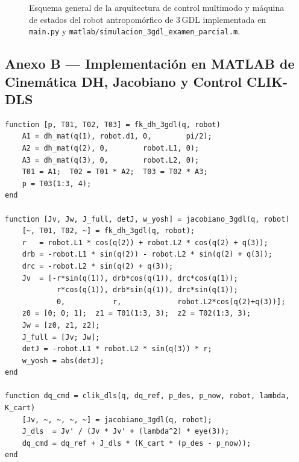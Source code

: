 \documentclass[11pt,a4paper]{article}
\newcommand{\qdot}{\dot{\bm{q}}}
\begin{document}
\begin{figure}[!htb]
{}%
\caption{Esquema general de la arquitectura de control multimodo y máquina de estados del robot antropomórfico de 3\,GDL implementada en \texttt{main.py} y \texttt{matlab/simulacion\_3gdl\_examen\_parcial.m}.}
\label{fig:arquitectura}
\end{figure}

\subsection{Anexo B --- Implementación en MATLAB de Cinemática DH, Jacobiano y Control CLIK-DLS}

\begin{lstlisting}[caption={Funciones principales de Denavit-Hartenberg, Jacobiano geométrico $6\times 3$ y ley de control cinemático CLIK-DLS en \texttt{matlab/simulacion\_3gdl\_examen\_parcial.m}.},label={lst:clik}]
function [p, T01, T02, T03] = fk_dh_3gdl(q, robot)
    A1 = dh_mat(q(1), robot.d1, 0,        pi/2);
    A2 = dh_mat(q(2), 0,        robot.L1, 0);
    A3 = dh_mat(q(3), 0,        robot.L2, 0);
    T01 = A1;  T02 = T01 * A2;  T03 = T02 * A3;
    p = T03(1:3, 4);
end

function [Jv, Jw, J_full, detJ, w_yosh] = jacobiano_3gdl(q, robot)
    [~, T01, T02, ~] = fk_dh_3gdl(q, robot);
    r   = robot.L1 * cos(q(2)) + robot.L2 * cos(q(2) + q(3));
    drb = -robot.L1 * sin(q(2)) - robot.L2 * sin(q(2) + q(3));
    drc = -robot.L2 * sin(q(2) + q(3));
    Jv  = [-r*sin(q(1)), drb*cos(q(1)), drc*cos(q(1));
            r*cos(q(1)), drb*sin(q(1)), drc*sin(q(1));
            0,           r,             robot.L2*cos(q(2)+q(3))];
    z0 = [0; 0; 1];  z1 = T01(1:3, 3);  z2 = T02(1:3, 3);
    Jw = [z0, z1, z2];
    J_full = [Jv; Jw];
    detJ = -robot.L1 * robot.L2 * sin(q(3)) * r;
    w_yosh = abs(detJ);
end

function dq_cmd = clik_dls(q, dq_ref, p_des, p_now, robot, lambda, K_cart)
    [Jv, ~, ~, ~, ~] = jacobiano_3gdl(q, robot);
    J_dls  = Jv' / (Jv * Jv' + (lambda^2) * eye(3));
    dq_cmd = dq_ref + J_dls * (K_cart * (p_des - p_now));
end
\end{lstlisting}
\clearpage  %
\end{document}
